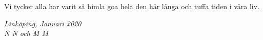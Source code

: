 \begin{acknowledgments}
  Vi tycker alla har varit så himla goa hela den här långa och tuffa tiden i våra liv.

  \addvspace{1em}
  \begin{flushright}
    \textit{%
      Linköping, Januari 2020\\
      N N och M M%
    }
  \end{flushright}
\end{acknowledgments}